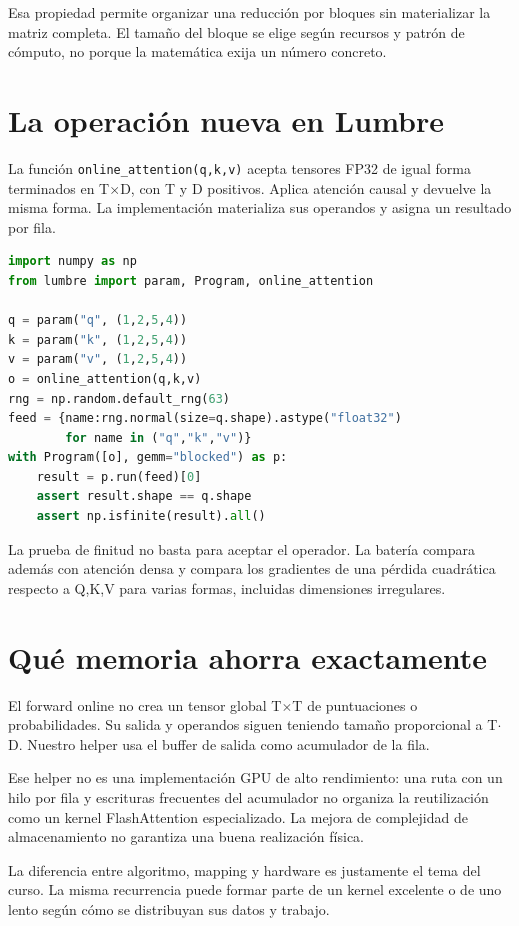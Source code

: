 \documentclass[12pt,a4paper,oneside]{report}
\begin{document}
Esa propiedad permite organizar una reducción por bloques sin materializar la matriz completa. El tamaño del bloque se elige según recursos y patrón de cómputo, no porque la matemática exija un número concreto.

\section{La operación nueva en Lumbre}
La función \texttt{online\_atten\allowbreak{}tion(q,k,v)} acepta tensores FP32 de igual forma terminados en T\ensuremath{\times}D, con T y D positivos. Aplica atención causal y devuelve la misma forma. La implementación materializa sus operandos y asigna un resultado por fila.

\begin{lstlisting}[language=Python]
import numpy as np
from lumbre import param, Program, online_attention

q = param("q", (1,2,5,4))
k = param("k", (1,2,5,4))
v = param("v", (1,2,5,4))
o = online_attention(q,k,v)
rng = np.random.default_rng(63)
feed = {name:rng.normal(size=q.shape).astype("float32")
        for name in ("q","k","v")}
with Program([o], gemm="blocked") as p:
    result = p.run(feed)[0]
    assert result.shape == q.shape
    assert np.isfinite(result).all()
\end{lstlisting}
La prueba de finitud no basta para aceptar el operador. La batería compara además con atención densa y compara los gradientes de una pérdida cuadrática respecto a Q,K,V para varias formas, incluidas dimensiones irregulares.

\section{Qué memoria ahorra exactamente}
El forward online no crea un tensor global T\ensuremath{\times}T de puntuaciones o probabilidades. Su salida y operandos siguen teniendo tamaño proporcional a T\ensuremath{\cdot}D. Nuestro helper usa el buffer de salida como acumulador de la fila.

Ese helper no es una implementación GPU de alto rendimiento: una ruta con un hilo por fila y escrituras frecuentes del acumulador no organiza la reutilización como un kernel FlashAttention especializado. La mejora de complejidad de almacenamiento no garantiza una buena realización física.

La diferencia entre algoritmo, mapping y hardware es justamente el tema del curso. La misma recurrencia puede formar parte de un kernel excelente o de uno lento según cómo se distribuyan sus datos y trabajo.
\end{document}
